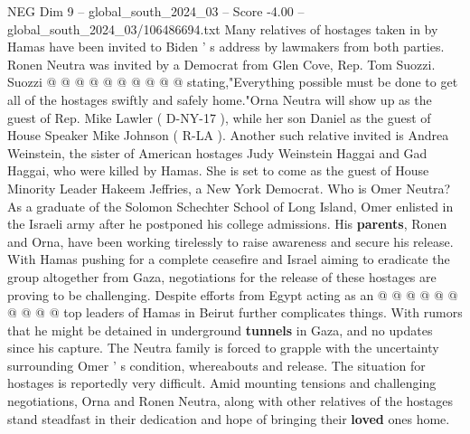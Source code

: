 \begin{textsample}{NEG Dim 9 – global\_south\_2024\_03 – Score -4.00 – global\_south\_2024\_03/106486694.txt}
Many relatives of hostages taken in by Hamas have been invited to Biden ' s address by lawmakers from both parties.
Ronen Neutra was invited by a Democrat from Glen Cove, Rep.
Tom Suozzi.
Suozzi @ @ @ @ @ @ @ @ @ @ stating,"Everything possible must be done to get all of the hostages swiftly and safely home."Orna Neutra will show up as the guest of Rep.
Mike Lawler ( D-NY-17 ), while her son Daniel as the guest of House Speaker Mike Johnson ( R-LA ).
Another such relative invited is Andrea Weinstein, the sister of American hostages Judy Weinstein Haggai and Gad Haggai, who were killed by Hamas.
She is set to come as the guest of House Minority Leader Hakeem Jeffries, a New York Democrat.
Who is Omer Neutra?
As a graduate of the Solomon Schechter School of Long Island, Omer enlisted in the Israeli army after he postponed his college admissions.
His \textbf{parents}, Ronen and Orna, have been working tirelessly to raise awareness and secure his release.
With Hamas pushing for a complete ceasefire and Israel aiming to eradicate the group altogether from Gaza, negotiations for the release of these hostages are proving to be challenging.
Despite efforts from Egypt acting as an @ @ @ @ @ @ @ @ @ @ top leaders of Hamas in Beirut further complicates things.
With rumors that he might be detained in underground \textbf{tunnels} in Gaza, and no updates since his capture.
The Neutra family is forced to grapple with the uncertainty surrounding Omer ' s condition, whereabouts and release.
The situation for hostages is reportedly very difficult.
Amid mounting tensions and challenging negotiations, Orna and Ronen Neutra, along with other relatives of the hostages stand steadfast in their dedication and hope of bringing their \textbf{loved} ones home.

\end{textsample}
